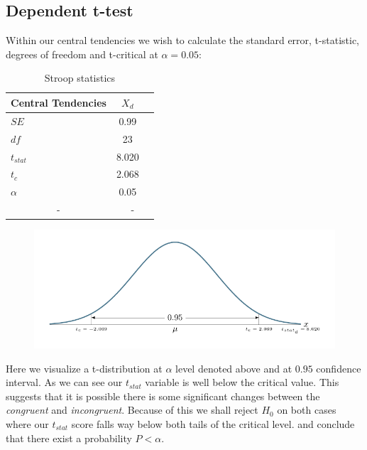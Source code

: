 \documentclass[8pt]{article}
\newcommand{\8}{\bar}
\begin{document}
\subsection{Dependent t-test} 
Within our central tendencies we wish to calculate the standard error, t-statistic, degrees of freedom and t-critical at $\alpha = 0.05$: 
\begin{table}[htbp]\centering \caption{Stroop statistics \label{sumstat}}
\begin{tabular}{l c c  }\hline\hline
\multicolumn{1}{c}{\textbf{Central Tendencies}}  & $X_{d}$ \\ \hline
$SE$ & 0.99\\
$df$ & 23\\
$t_{stat}$ &  8.020 \\ 
$t_{c}$ &  2.068\\ 
$\alpha$ & 0.05\\
\multicolumn{1}{c}{-} & \multicolumn{2}{c}{-}\\ \hline
\end{tabular}
\end{table}
\begin{figure}[H]
\includegraphics[page=1,scale=0.8]{t_stat_d.pdf} 
\end{figure} 

Here we visualize a t-distribution at $\alpha$ level denoted above and at $0.95$ confidence interval. As we can see our $t_{stat}$ variable is well below the critical value. This suggests that it is possible there is some significant changes between the \textit{congruent} and \textit{incongruent}. Because of this we shall reject $H_{0}$ on both cases where our $t_{stat}$ score falls way below both tails of the critical level. and conclude that there exist a probability $P < \alpha$.
\end{document}
